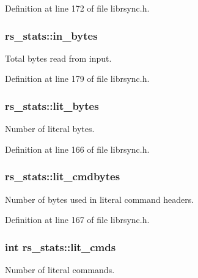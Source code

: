 Definition at line 172 of file librsync.\+h.

\hypertarget{structrs__stats_afc6c46001cdce8922e443946c4151051}{}
\subsubsection[{in\+\_\+bytes}]{ rs\+\_\+stats\+::in\+\_\+bytes}\label{structrs__stats_afc6c46001cdce8922e443946c4151051}
Total bytes read from input. 

Definition at line 179 of file librsync.\+h.

\hypertarget{structrs__stats_af21a0846d6bafd18f6f592862808fac4}{}
\subsubsection[{lit\+\_\+bytes}]{ rs\+\_\+stats\+::lit\+\_\+bytes}\label{structrs__stats_af21a0846d6bafd18f6f592862808fac4}
Number of literal bytes. 

Definition at line 166 of file librsync.\+h.

\hypertarget{structrs__stats_a30dfcfe89000e028ca4054c8501879fc}{}
\subsubsection[{lit\+\_\+cmdbytes}]{ rs\+\_\+stats\+::lit\+\_\+cmdbytes}\label{structrs__stats_a30dfcfe89000e028ca4054c8501879fc}
Number of bytes used in literal command headers. 

Definition at line 167 of file librsync.\+h.

\hypertarget{structrs__stats_a0126775feaafac1539f519ac56346713}{}
\subsubsection[{lit\+\_\+cmds}]{\setlength{\rightskip}{0pt plus 5cm}int rs\+\_\+stats\+::lit\+\_\+cmds}\label{structrs__stats_a0126775feaafac1539f519ac56346713}
Number of literal commands. 

